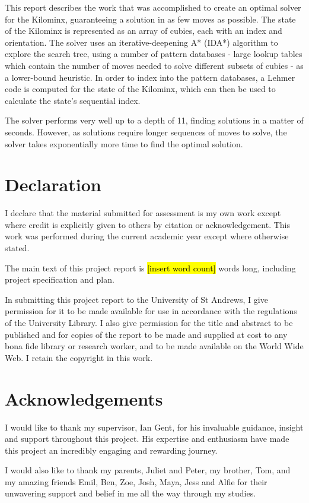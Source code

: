 \documentclass[12pt]{report}
\newcommand{\hlc}[2][yellow]{{%
    \colorlet{foo}{#1}%
    \sethlcolor{foo}\hl{#2}}%
}
\begin{document}
This report describes the work that was accomplished to create an optimal solver for the Kilominx, guaranteeing a solution in as few moves as possible. The state of the Kilominx is represented as an array of cubies, each with an index and orientation. The solver uses an iterative-deepening A* (IDA*) algorithm to explore the search tree, using a number of pattern databases - large lookup tables which contain the number of moves needed to solve different subsets of cubies - as a lower-bound heuristic. In order to index into the pattern databases, a Lehmer code is computed for the state of the Kilominx, which can then be used to calculate the state's sequential index.

The solver performs very well up to a depth of 11, finding solutions in a matter of seconds. However, as solutions require longer sequences of moves to solve, the solver takes exponentially more time to find the optimal solution.


\chapter*{Declaration}
I declare that the material submitted for assessment is my own work except where credit is explicitly given to others by citation or acknowledgement. This work was performed during the current academic year except where otherwise stated.

The main text of this project report is \hlc[yellow]{[insert word count]} words long, including project specification and plan.

In submitting this project report to the University of St Andrews, I give permission for it to be made available for use in accordance with the regulations of the University Library. I also give permission for the title and abstract to be published and for copies of the report to be made and supplied at cost to any bona fide library or research worker, and to be made available on the World Wide Web. I retain the copyright in this work.

\chapter*{Acknowledgements}
I would like to thank my supervisor, Ian Gent, for his invaluable guidance, insight and support throughout this project. His expertise and enthusiasm have made this project an incredibly engaging and rewarding journey.

I would also like to thank my parents, Juliet and Peter, my brother, Tom, and my amazing friends Emil, Ben, Zoe, Josh, Maya, Jess and Alfie for their unwavering support and belief in me all the way through my studies.
\end{document}

